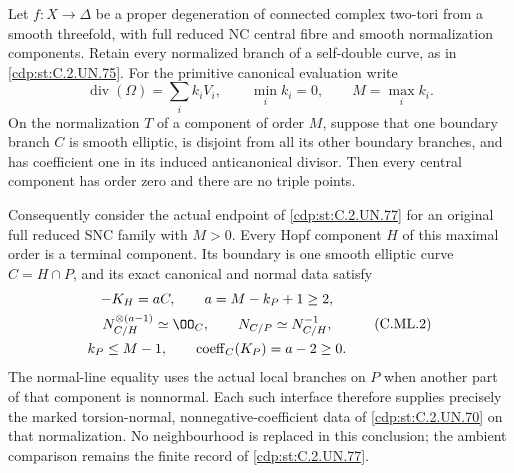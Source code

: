 
\begin{proposition}\label{cdp:st:C.2.UN.82}
Let \(f:X\to\Delta\) be a proper degeneration of connected
complex two-tori from a smooth threefold, with full reduced
NC central fibre and smooth normalization components. Retain
every normalized branch of a self-double curve, as in \ref{cdp:st:C.2.UN.75}.
For the primitive canonical evaluation write
\[
       \operatorname{div}(\Omega)=\sum_i k_iV_i,
       \qquad \min_i k_i=0,\qquad M=\max_i k_i .
\tag{C.ML.1}\label{cdp:eq:C.ML.1}
\]
On the normalization \(T\) of a component of order \(M\),
suppose that one boundary branch \(C\) is smooth elliptic,
is disjoint from all its other boundary branches, and has
coefficient one in its induced anticanonical divisor.
Then every central component has order zero and there
are no triple points.

Consequently consider the actual endpoint of \ref{cdp:st:C.2.UN.77} for
an original full reduced SNC family with \(M>0\).
Every Hopf component \(H\) of this maximal order is a
terminal component. Its boundary is one smooth elliptic
curve \(C=H\cap P\), and its exact canonical and normal
data satisfy
\[
 \begin{gathered}
       -K_H=aC,\qquad a=M-k_P+1\ge2,\\
       N_{C/H}^{\otimes(a-1)}\simeq\OO_C,
       \qquad N_{C/P}\simeq N_{C/H}^{-1},\\
       k_P\le M-1,\qquad
       \operatorname{coeff}_C(K_P)=a-2\ge0 .
 \end{gathered}
\tag{C.ML.2}\label{cdp:eq:C.ML.2}
\]
The normal-line equality uses the actual local branches
on \(P\) when another part of that component is nonnormal.
Each such interface therefore supplies precisely the
marked torsion-normal, nonnegative-coefficient data of
\ref{cdp:st:C.2.UN.70} on that normalization. No neighbourhood is replaced
in this conclusion; the ambient comparison remains the
finite record of \ref{cdp:st:C.2.UN.77}.
\end{proposition}

